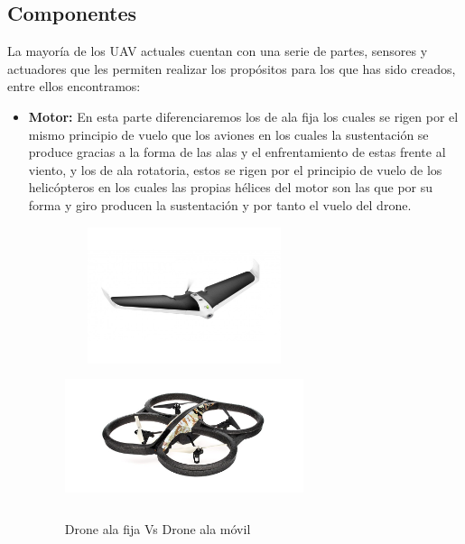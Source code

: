\subsection{Componentes}
\hspace{1cm} La mayoría de los UAV actuales cuentan con una serie de partes, sensores y actuadores que les permiten realizar los propósitos para los que has sido creados, entre ellos encontramos: 
	\begin{itemize}
		\item \textbf{Motor:} En esta parte diferenciaremos los de ala fija los cuales se rigen por el mismo principio de vuelo que los aviones en los cuales la sustentación se produce gracias a la forma de las alas y el enfrentamiento de estas frente al viento, y los de ala rotatoria, estos se rigen por el principio de vuelo de los helicópteros en los cuales las propias hélices del motor son las que por su forma y giro producen la sustentación y por tanto el vuelo del drone.
		 		
\begin{figure}[H]
 \centering
    \includegraphics[width=7cm,height=4cm]{imag/IMG15.jpeg}
    \includegraphics[width=7cm,height=4cm]{imag/IMG16.jpeg}
 \caption{Drone ala fija Vs Drone ala móvil}
 \label{f:Tipos de Drone}
\end{figure}


\end{itemize}
